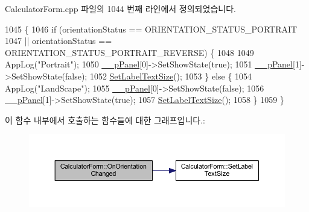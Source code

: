 Calculator\+Form.\+cpp 파일의 1044 번째 라인에서 정의되었습니다.


\begin{DoxyCode}
1045                                                     \{
1046     \textcolor{keywordflow}{if} (orientationStatus == ORIENTATION\_STATUS\_PORTRAIT
1047             || orientationStatus == ORIENTATION\_STATUS\_PORTRAIT\_REVERSE) \{
1048 
1049         AppLog(\textcolor{stringliteral}{"Portrait"});
1050         \hyperlink{class_calculator_form_ae930aeea4ccaf0fd752c11350c6e2af6}{\_\_pPanel}[0]->SetShowState(\textcolor{keyword}{true});
1051         \hyperlink{class_calculator_form_ae930aeea4ccaf0fd752c11350c6e2af6}{\_\_pPanel}[1]->SetShowState(\textcolor{keyword}{false});
1052         \hyperlink{class_calculator_form_ac55d87afff38e894b348eeb01a058c70}{SetLabelTextSize}();
1053     \} \textcolor{keywordflow}{else} \{
1054         AppLog(\textcolor{stringliteral}{"LandScape"});
1055         \hyperlink{class_calculator_form_ae930aeea4ccaf0fd752c11350c6e2af6}{\_\_pPanel}[0]->SetShowState(\textcolor{keyword}{false});
1056         \hyperlink{class_calculator_form_ae930aeea4ccaf0fd752c11350c6e2af6}{\_\_pPanel}[1]->SetShowState(\textcolor{keyword}{true});
1057         \hyperlink{class_calculator_form_ac55d87afff38e894b348eeb01a058c70}{SetLabelTextSize}();
1058     \}
1059 \}
\end{DoxyCode}


이 함수 내부에서 호출하는 함수들에 대한 그래프입니다.\+:
\nopagebreak
\begin{figure}[H]
\begin{center}
\leavevmode
\includegraphics[width=350pt]{class_calculator_form_ac298449ce5bedae6a69ccd2f13594ce2_cgraph}
\end{center}
\end{figure}


